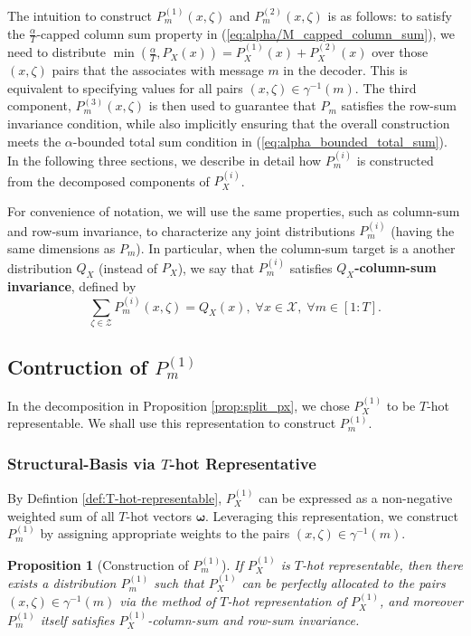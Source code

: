 \documentclass[11pt,letterpaper]{article}
\newtheorem{prop}{\textbf{Proposition}}
\newcommand{\cX}{\mathcal{X}}
\newcommand{\cZ}{\mathcal{Z}}
\begin{document}
The intuition to construct $P_m^{(1)}(x,\zeta)$ and $P_m^{(2)}(x,\zeta)$ is as follows: to satisfy the $\tfrac{\alpha}{T}$-capped column sum property in (\ref{eq:alpha/M_capped_column_sum}), we need to distribute $\min(\tfrac{\alpha}{T}, P_X(x)) = P_X^{(1)}(x) + P_X^{(2)}(x)$ over those $(x,\zeta)$ pairs that the associates with message $m$ in the decoder. This is equivalent to specifying values for all pairs $(x,\zeta) \in \gamma^{-1}(m)$.  The third component, $P_m^{(3)}(x,\zeta)$ is then used to guarantee that $P_m$ satisfies the row-sum invariance condition, while also implicitly ensuring that the overall construction meets the $\alpha$-bounded total sum condition in (\ref{eq:alpha_bounded_total_sum}). In the following three sections, we describe in detail how $P_m^{(i)}$ is constructed from the decomposed components of $P_X^{(i)}$. 

For convenience of notation, we will use the same properties, such as column-sum and row-sum invariance, to characterize any joint distributions $P^{(i)}_m$ (having the same dimensions as $P_m$).
In particular, when the column-sum target is a another distribution $Q_X$ (instead of $P_X$), we say that
$P^{(i)}_m$ satisfies \textbf{$Q_X$-column-sum invariance}, defined by
\begin{equation}
    \label{eq:QX_column_sum_invariance}
    \sum_{\zeta \in \cZ}P^{(i)}_m(x,\zeta) = Q_X(x),\; \forall x \in \cX, \;  \forall m\in[1:T].
\end{equation}


\subsection{Contruction of $P_m^{(1)}$ } \label{sec:construct_Pm1}
In the decomposition in Proposition \ref{prop:split_px}, we chose $P_X^{(1)}$ to be $T$-hot representable. We shall use this representation to construct $P_m^{(1)}$.

\subsubsection{Structural-Basis via $T$-hot Representative}

By Defintion \ref{def:T-hot-representable}, $P_X^{(1)}$ can be expressed as a non-negative weighted sum of all $T$-hot vectors $\boldsymbol{\omega}$. Leveraging this representation, we construct $P_m^{(1)}$ by assigning appropriate weights to the pairs  $(x,\zeta) \in \gamma^{-1}(m)$.

\begin{prop} [Construction of $P_m^{(1)}$] \label{prop:construct_pm1}
    If $P_X^{(1)}$ is $T$-hot representable, then there exists a distribution $P_m^{(1)}$ such that $P_X^{(1)}$ can be perfectly allocated to the pairs $(x, \zeta) \in \gamma^{-1}(m)$ via the method of $T$-hot representation of $P_X^{(1)}$, and moreover $P_m^{(1)}$ itself satisfies $P_X^{(1)}$-column-sum and row-sum invariance.
\end{prop}
\end{document}
